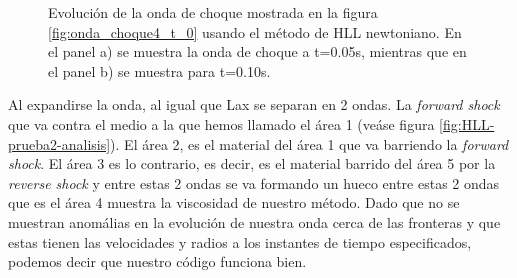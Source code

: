\documentclass[12pt,a4paper]{book}
\begin{document}
\begin{figure}[H]
\caption{\label{fig:HLL-prueba2}Evolución de la onda de choque mostrada en la figura \ref{fig:onda_choque4_t_0} usando el método de HLL newtoniano. En el panel a) se muestra la onda de choque a t=0.05s, mientras que en el panel b) se muestra para t=0.10s.}  
\end{figure}

Al expandirse la onda, al igual que Lax se separan en 2 ondas. La \emph{forward shock} que va contra el medio a la que hemos llamado el área 1 (veáse figura \ref{fig:HLL-prueba2-analisis}). El área 2, es el material del área 1 que va barriendo la \emph{forward shock}. El área 3 es lo contrario, es decir, es el material barrido del área 5 por la \emph{reverse shock} y entre estas 2 ondas se va formando un hueco entre estas 2 ondas que es el área 4 muestra la viscosidad de nuestro método. Dado  que no se muestran anomálias en la evolución de nuestra onda cerca de las fronteras y que estas tienen las velocidades y radios a los instantes de tiempo especificados, podemos decir que nuestro código funciona bien.
\end{document}
